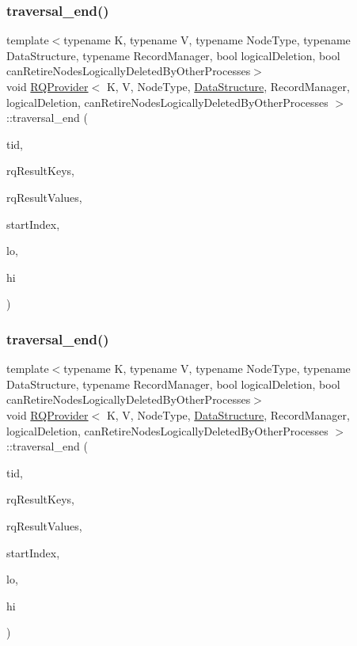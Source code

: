 \subsubsection{\texorpdfstring{traversal\+\_\+end()}{traversal\_end()}\hspace{0.1cm}{\footnotesize\ttfamily [1/5]}}
{\footnotesize\ttfamily template$<$typename K, typename V, typename Node\+Type, typename Data\+Structure, typename Record\+Manager, bool logical\+Deletion, bool can\+Retire\+Nodes\+Logically\+Deleted\+By\+Other\+Processes$>$ \\
void \hyperlink{classRQProvider}{R\+Q\+Provider}$<$ K, V, Node\+Type, \hyperlink{classDataStructure}{Data\+Structure}, Record\+Manager, logical\+Deletion, can\+Retire\+Nodes\+Logically\+Deleted\+By\+Other\+Processes $>$\+::traversal\+\_\+end (\begin{DoxyParamCaption}\item[{const int}]{tid,  }\item[{K $\ast$const}]{rq\+Result\+Keys,  }\item[{V $\ast$const}]{rq\+Result\+Values,  }\item[{int $\ast$const}]{start\+Index,  }\item[{const K \&}]{lo,  }\item[{const K \&}]{hi }\end{DoxyParamCaption})\hspace{0.3cm}{\ttfamily [inline]}}

\mbox{\label{classRQProvider_ad4bbd6a7d5ea8f497a49ba3bbd03f7fc}} 
\subsubsection{\texorpdfstring{traversal\+\_\+end()}{traversal\_end()}\hspace{0.1cm}{\footnotesize\ttfamily [2/5]}}
{\footnotesize\ttfamily template$<$typename K, typename V, typename Node\+Type, typename Data\+Structure, typename Record\+Manager, bool logical\+Deletion, bool can\+Retire\+Nodes\+Logically\+Deleted\+By\+Other\+Processes$>$ \\
void \hyperlink{classRQProvider}{R\+Q\+Provider}$<$ K, V, Node\+Type, \hyperlink{classDataStructure}{Data\+Structure}, Record\+Manager, logical\+Deletion, can\+Retire\+Nodes\+Logically\+Deleted\+By\+Other\+Processes $>$\+::traversal\+\_\+end (\begin{DoxyParamCaption}\item[{const int}]{tid,  }\item[{K $\ast$const}]{rq\+Result\+Keys,  }\item[{V $\ast$const}]{rq\+Result\+Values,  }\item[{int $\ast$const}]{start\+Index,  }\item[{const K \&}]{lo,  }\item[{const K \&}]{hi }\end{DoxyParamCaption})\hspace{0.3cm}{\ttfamily [inline]}}


